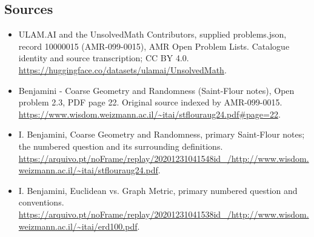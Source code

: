 \documentclass[11pt,a4paper]{article}
\begin{document}
\subsection{Sources}
\begin{itemize}
\item[S1] ULAM.AI and the UnsolvedMath Contributors, supplied problems.json, record 10000015 (AMR-099-0015), AMR Open Problem Lists. Catalogue identity and source transcription; CC BY 4.0.
\url{https://huggingface.co/datasets/ulamai/UnsolvedMath}.
\item[S2] Benjamini - Coarse Geometry and Randomness (Saint-Flour notes), Open problem 2.3, PDF page 22. Original source indexed by AMR-099-0015.
\url{https://www.wisdom.weizmann.ac.il/~itai/stflouraug24.pdf#page=22}.
\item[S3] I. Benjamini, Coarse Geometry and Randomness, primary Saint-Flour notes; the numbered question and its surrounding definitions.
\url{https://arquivo.pt/noFrame/replay/20201231041548id_/http://www.wisdom.weizmann.ac.il/~itai/stflouraug24.pdf}.
\item[S4] I. Benjamini, Euclidean vs. Graph Metric, primary numbered question and conventions.
\url{https://arquivo.pt/noFrame/replay/20201231041538id_/http://www.wisdom.weizmann.ac.il/~itai/erd100.pdf}.
\end{itemize}
\end{document}
